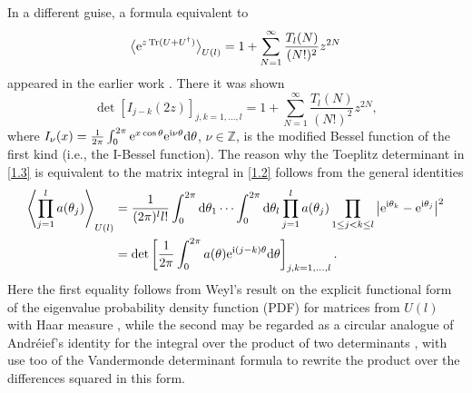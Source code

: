 \documentclass[pdftex]{sigma}
\numberwithin{equation}{section}
\theoremstyle{definition}
\begin{document}
In a different guise, a formula equivalent to
\begin{equation}\label{1.2}
\big \langle {\rm e}^{z \operatorname{Tr} (U + U^\dagger)} \big \rangle_{U(l)} =
1 + \sum_{N=1}^\infty \frac{T_l(N)}{(N!)^2} z^{2N}
\end{equation}
appeared in the earlier work \cite{Ge90}. There it was shown
\begin{equation}\label{1.3}
\det [ I_{j-k}(2z) ]_{j,k=1,\dots,l} =
1 + \sum_{N=1}^\infty \frac{T_l(N)}{(N!)^2} z^{2N},
\end{equation}
where $I_\nu(x) = {1 \over 2 \pi} \int_0^{2 \pi} {\rm e}^{x \cos \theta} {\rm e}^{{\rm i} \nu \theta} {\rm d }\theta$, $\nu \in \mathbb Z$, is the modified Bessel function of the first kind (i.e., the I-Bessel function). The reason why the Toeplitz determinant in \eqref{1.3} is equivalent to the matrix integral in \eqref{1.2} follows from the general identities
\begin{align}
\left \langle \prod_{j=1}^l a(\theta_j) \right \rangle_{U(l)} &=
{1 \over (2 \pi)^l l!} \int_0^{2 \pi} {\rm d} \theta_1 \cdots \int_0^{2 \pi} {\rm d} \theta_l \prod_{j=1}^l a(\theta_j)
\prod_{1 \le j < k \le l} \big| {\rm e}^{{\rm i} \theta_k} - {\rm e}^{{\rm i} \theta_j} \big|^2\nonumber \\
&= \det \left [ {1 \over 2 \pi} \int_0^{2 \pi} a(\theta) {\rm e}^{{\rm i} (j-k) \theta}
{\rm d }\theta \right ]_{j,k=1,\dots,l}.\label{1.4}
\end{align}
Here the first equality follows from Weyl's result on the explicit functional form of the eigenvalue probability density function (PDF) for matrices from $U(l)$ with Haar measure \cite{DF17,We39}, while the second may be regarded as a circular analogue of Andr\'eief's identity for the integral over the product of two determinants \cite{Fo19}, with use too of the Vandermonde determinant formula to rewrite the product over the differences squared in this form.
\end{document}
